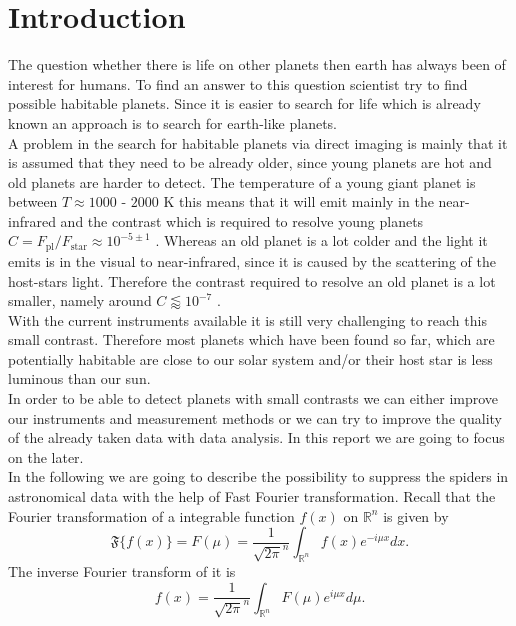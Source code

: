 \section{Introduction}
The question whether there is life on other planets then earth has always been of interest for humans. To find an answer to this question scientist try to find possible habitable planets. Since it is easier to search for life which is already known an approach is to search for earth-like planets.\\
A problem in the search for habitable planets via direct imaging is mainly that it is assumed that they need to be already older, since young planets are hot and old planets are harder to detect. The temperature of a young giant planet is between $T \approx 1000$ - $2000$ K this means that it will emit mainly in the near-infrared and the contrast which is required to resolve young planets $C = F_{\mathrm{pl}}/F_{\mathrm{star}} \approx 10^{-5 \pm 1}$ \cite{Hunziker2020}. Whereas an old planet is a lot colder and the light it emits is in the visual to near-infrared, since it is caused by the scattering of the host-stars light. Therefore the contrast required to resolve an old planet is a lot smaller, namely around $C \lessapprox 10^{-7}$ \cite{Hunziker2020}.\\
With the current instruments available it is still very challenging to reach this small contrast. Therefore most planets which have been found so far, which are potentially habitable are close to our solar system and/or their host star is less luminous than our sun.\\
In order to be able to detect planets with small contrasts we can either improve our instruments and measurement methods or we can try to improve the quality of the already taken data with data analysis. In this report we are going to focus on the later. \\
In the following we are going to describe the possibility to suppress the spiders in astronomical data with the help of Fast Fourier transformation. Recall that the Fourier transformation of a integrable function $f(x)$ on $\mathbb{R}^n$ is given by
\begin{equation}
	\mathfrak{F}\{f(x)\} = F(\mu) = \frac{1}{\sqrt{2\pi}^n} \int_{\mathbb{R}^n} f(x) e^{-i\mu x} dx.
\end{equation}
The inverse Fourier transform of it is
\begin{equation}
	f(x) = \frac{1}{\sqrt{2\pi}^n} \int_{\mathbb{R}^n} F(\mu) e^{i\mu x} d\mu.
\end{equation}
